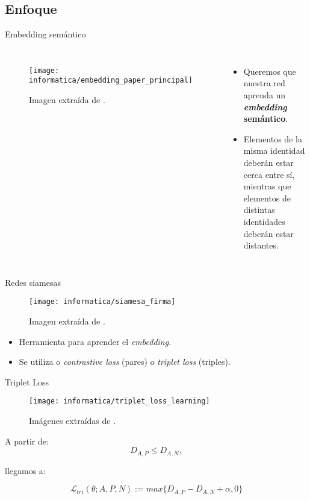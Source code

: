 \subsection{Enfoque}

\begin{frame}{Embedding semántico}
	\begin{columns}
		\centering
		\begin{figure}
			\texttt{[image: informatica/embedding\_paper\_principal]}
			\caption{Imagen extraída de \cite{informatica:principal}.}
		\end{figure}
		\begin{itemize}
			\item Queremos que nuestra red aprenda un \textbf{\textit{embedding} semántico}.
			\item Elementos de la misma identidad deberán estar cerca entre sí, mientras que elementos de distintas identidades deberán estar distantes.
		\end{itemize}
	\end{columns}
\end{frame}

\begin{frame}{Redes siamesas}

	\begin{figure}
		\texttt{[image: informatica/siamesa\_firma]}
		\caption{Imagen extraída de \cite{informatica:siamesa_web_imagen}.}
		\label{img:siamesa_firma}
	\end{figure}

	\begin{itemize}
		\item Herramienta para aprender el \textit{embedding}.
		\item Se utiliza o \textit{contrastive loss} (pares) o \textit{triplet loss} (triples).
	\end{itemize}

\end{frame}

\begin{frame}{Triplet Loss}
	\begin{figure}
		\texttt{[image: informatica/triplet\_loss\_learning]}
		\caption{Imágenes extraídas de \cite{informatica:cacd_dataset}.}
	\end{figure}

	A partir de:
	\begin{equation}
		D_{A, P} \leq D_{A, N},
	\end{equation}

	llegamos a:

	\begin{equation} \label{ieq:triplet_loss_single_entry}
		\mathcal{L}_{tri}(\theta; A, P, N) := max \{D_{A, P} - D_{A, N} + \alpha, 0 \}
	\end{equation}
\end{frame}

